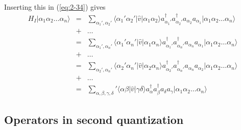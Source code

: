 \documentclass[%
twoside,                 %
final,                   %
10pt]{article}
\begin{document}
\paragraph{}
Inserting this in (\ref{eq:2-34}) gives
\begin{eqnarray}
	H_I |\alpha_1\alpha_2\dots\alpha_n\rangle
	&=& \sum_{\alpha_1', \alpha_2'} \langle \alpha_1'\alpha_2'|\hat{v}|\alpha_1\alpha_2\rangle
		a_{\alpha_1'}^{\dagger} a_{\alpha_2'}^{\dagger} a_{\alpha_2} a_{\alpha_1}
		|\alpha_1\alpha_2\dots\alpha_n\rangle \nonumber \\
	&+& \dots \nonumber \\
	&=& \sum_{\alpha_1', \alpha_n'} \langle \alpha_1'\alpha_n'|\hat{v}|\alpha_1\alpha_n\rangle
		a_{\alpha_1'}^{\dagger} a_{\alpha_n'}^{\dagger} a_{\alpha_n} a_{\alpha_1}
		|\alpha_1\alpha_2\dots\alpha_n\rangle \nonumber \\
	&+& \dots \nonumber \\
	&=& \sum_{\alpha_2', \alpha_n'} \langle \alpha_2'\alpha_n'|\hat{v}|\alpha_2\alpha_n\rangle
		a_{\alpha_2'}^{\dagger} a_{\alpha_n'}^{\dagger} a_{\alpha_n} a_{\alpha_2}
		|\alpha_1\alpha_2\dots\alpha_n\rangle \nonumber \\
	&+& \dots \nonumber \\
	&=& \sum_{\alpha, \beta, \gamma, \delta} ' \langle \alpha\beta|\hat{v}|\gamma\delta\rangle
		a^{\dagger}_\alpha a^{\dagger}_\beta a_\delta a_\gamma
		|\alpha_1\alpha_2\dots\alpha_n\rangle \label{eq:2-36}
\end{eqnarray}







\subsection*{Operators in second quantization}

\end{document}
